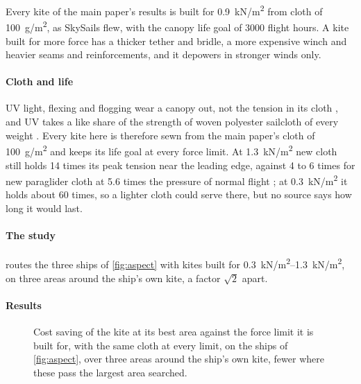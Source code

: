 \documentclass[3p,times,authoryear]{elsarticle}
\begin{document}
Every kite of the main paper's results is built for \SI{0.9}{kN/m^2} from cloth of \SI{100}{g/m^2}, as SkySails flew, with the canopy life goal of \num{3000} flight hours. A kite built for more force has a thicker tether and bridle, a more expensive winch and heavier seams and reinforcements, and it depowers in stronger winds only.

\paragraph{Cloth and life} UV light, flexing and flogging wear a canopy out, not the tension in its cloth \citep{northsails_durability,maslanka2023}, and UV takes a like share of the strength of woven polyester sailcloth of every weight \citep[Table~3]{ceylan2023}. Every kite here is therefore sewn from the main paper's cloth of \SI{100}{g/m^2} and keeps its life goal at every force limit. At \SI{1.3}{kN/m^2} new cloth still holds 14 times its peak tension near the leading edge, against 4 to 6 times for new paraglider cloth at 5.6 times the pressure of normal flight \citep{maslanka2023}; at \SI{0.3}{kN/m^2} it holds about 60 times, so a lighter cloth could serve there, but no source says how long it would last.

\paragraph{The study}  routes the three ships of \cref{fig:aspect} with kites built for \SIrange{0.3}{1.3}{kN/m^2}, on three areas around the ship's own kite, a factor $\sqrt2$ apart.

\paragraph{Results} 

\begin{figure}[tbp]
\centering
{}
\caption{ Cost saving of the kite at its best area against the force limit it is built for, with the same cloth at every limit, on the ships of \cref{fig:aspect}, over three areas around the ship's own kite, fewer where these pass the largest area searched.}
\label{fig:force_rating}
\end{figure}



\end{document}

